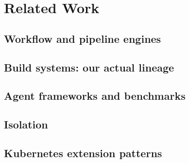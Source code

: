 \section{Related Work}
\label{sec:related}


\subsection{Workflow and pipeline engines}

\subsection{Build systems: our actual lineage}

\subsection{Agent frameworks and benchmarks}

\subsection{Isolation}

\subsection{Kubernetes extension patterns}
